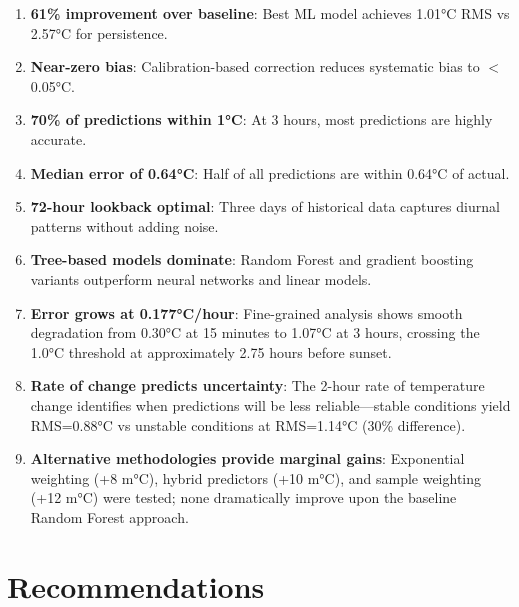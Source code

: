 \documentclass[11pt,letterpaper]{article}
\begin{document}
\begin{enumerate}
    \item \textbf{61\% improvement over baseline}: Best ML model achieves 1.01°C RMS vs 2.57°C for persistence.

    \item \textbf{Near-zero bias}: Calibration-based correction reduces systematic bias to $<$0.05°C.

    \item \textbf{70\% of predictions within 1°C}: At 3 hours, most predictions are highly accurate.

    \item \textbf{Median error of 0.64°C}: Half of all predictions are within 0.64°C of actual.

    \item \textbf{72-hour lookback optimal}: Three days of historical data captures diurnal patterns without adding noise.

    \item \textbf{Tree-based models dominate}: Random Forest and gradient boosting variants outperform neural networks and linear models.

    \item \textbf{Error grows at 0.177°C/hour}: Fine-grained analysis shows smooth degradation from 0.30°C at 15 minutes to 1.07°C at 3 hours, crossing the 1.0°C threshold at approximately 2.75 hours before sunset.

    \item \textbf{Rate of change predicts uncertainty}: The 2-hour rate of temperature change identifies when predictions will be less reliable---stable conditions yield RMS=0.88°C vs unstable conditions at RMS=1.14°C (30\% difference).

    \item \textbf{Alternative methodologies provide marginal gains}: Exponential weighting (+8 m°C), hybrid predictors (+10 m°C), and sample weighting (+12 m°C) were tested; none dramatically improve upon the baseline Random Forest approach.
\end{enumerate}

\section{Recommendations}
\end{document}
